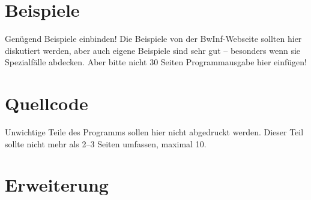 \documentclass[a4paper,10pt,ngerman]{scrartcl}
\begin{document}
\section{Beispiele}
Genügend Beispiele einbinden! Die Beispiele von der BwInf-Webseite sollten hier diskutiert werden, aber auch eigene Beispiele sind sehr gut – besonders wenn sie Spezialfälle abdecken. Aber bitte nicht 30 Seiten Programmausgabe hier einfügen!

\section{Quellcode}
Unwichtige Teile des Programms sollen hier nicht abgedruckt werden. Dieser Teil sollte nicht mehr als 2–3 Seiten umfassen, maximal 10.

\section{Erweiterung}
\end{document}
